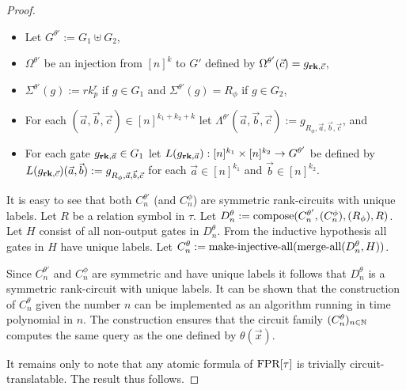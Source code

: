 \documentclass[../paper.tex]{subfiles}
\begin{document}
\begin{proof}
  \begin{itemize}
    \setlength\itemsep{0mm}
  \item Let $G^{\theta'} := G_1 \uplus G_2$,
  \item $\Omega^{\theta'}$ be an injection from $[n]^k$ to $G'$ defined by
    $\Omega^{\theta'}(\vec{c}) = g_{\text{\textbf{rk}}, \vec{c}}$,

  \item $\Sigma^{\theta'} (g) := rk^r_p$ if $g \in G_1$ and $\Sigma^{\theta'}(g)
    = R_\phi$ if $g \in G_2$,
  \item For each $(\vec{a}, \vec{b}, \vec{c}) \in [n]^{k_1 +k_2 + k}$ let
    $\Lambda^{\theta'} (\vec{a}, \vec{b}, \vec{c}) := g_{R_{\phi}, \vec{a},
      \vec{b}, \vec{c}}$, and

  \item For each gate $g_{\text{\textbf{rk}}, \vec{a}} \in G_1$ let $L(g_{\text{\textbf{rk}}, \vec{a}}):
    [n]^{k_1} \times [n]^{k_2} \rightarrow G^{\theta'}$ be defined by
    $L(g_{\text{\textbf{rk}}, \vec{c}})(\vec{a}, \vec{b}) := g_{R_\phi, \vec{a}, \vec{b},
      \vec{c}}$ for each $\vec{a} \in [n]^{k_1}$ and $\vec{b} \in [n]^{k_2}$.
  \end{itemize}
 
  It is easy to see that both $C^{\theta'}_n$ (and $C^{\phi}_n$) are symmetric
  rank-circuits with unique labels. Let $R$ be a relation symbol in $\tau$. Let
  $D^{\theta}_n := \text{\upshape compose}(C^{\theta'}_n, (C^{\phi}_n), (R_\phi), R)$. Let
  $H$ consist of all non-output gates in $D^{\theta}_n$. From the inductive
  hypothesis all gates in $H$ have unique labels. Let $C^{\theta}_n :=
  \text{\upshape make-injective-all}(\text{\upshape merge-all}(D^{\theta}_n, H))$.


  Since $C^{\theta'}_n$ and $C^{\phi}_n$ are symmetric and have unique labels it
  follows that $D^{\theta}_n$ is a symmetric rank-circuit with unique labels. It
  can be shown that the construction of $C^{\theta}_n$ given the number $n$ can
  be implemented as an algorithm running in time polynomial in $n$. The
  construction ensures that the circuit family $(C^{\theta}_n)_{n \in \mathbb{N}}$
  computes the same query as the one defined by $\theta(\vec{x})$.
 
  It remains only to note that any atomic formula of $\text{\upshape FPR}[\tau]$ is trivially
  circuit-translatable. The result thus follows.
\end{proof}
  
\end{document}
